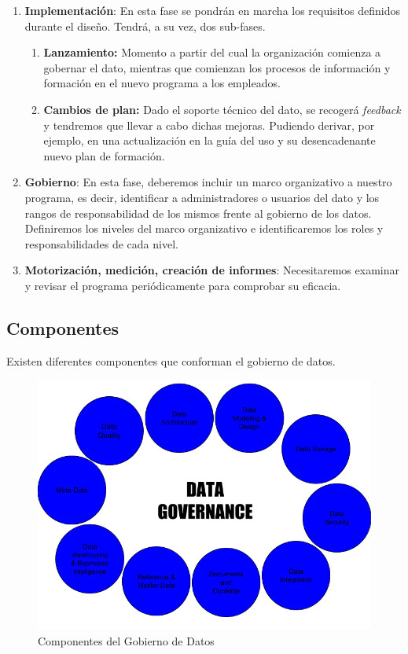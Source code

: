 \documentclass{article}
\begin{document}
\begin{enumerate}
	\item \textbf{Implementación}: En esta fase se pondrán en marcha los requisitos definidos durante el diseño. Tendrá, a su vez, dos sub-fases.
	\begin{enumerate}
		\item \textbf{Lanzamiento:} Momento a partir del cual la organización comienza a gobernar el dato, mientras que comienzan los procesos de información y formación en el nuevo programa a los empleados.
		\item \textbf{Cambios de plan:} Dado el soporte técnico del dato, se recogerá \textit{feedback} y tendremos que llevar a cabo dichas mejoras. Pudiendo derivar, por ejemplo, en una actualización en la guía del uso y su desencadenante nuevo plan de formación.
	\end{enumerate}
	
	\item \textbf{Gobierno}: En esta fase, deberemos incluir un marco organizativo a nuestro programa, es decir, identificar a administradores o usuarios del dato y los rangos de responsabilidad de los mismos frente al gobierno de los datos. Definiremos los niveles del marco organizativo e identificaremos los roles y responsabilidades de cada nivel.
	
	\item \textbf{Motorización, medición, creación de informes}: Necesitaremos examinar y revisar el programa periódicamente para comprobar su eficacia.


\end{enumerate}

\subsection{Componentes}
\label{componentes}
Existen diferentes componentes que conforman el gobierno de datos.

\begin{figure}[h]
	\centering
	\includegraphics[width=\linewidth]{"componentes"}
	\caption{Componentes del Gobierno de Datos}
	\label{fig:componentes}
\end{figure}
\end{document}
